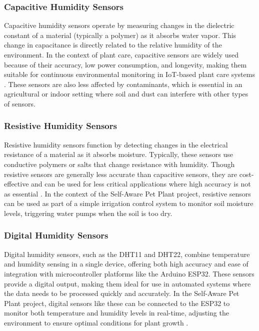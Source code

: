 \documentclass[12pt,a4paper,oneside,english]{book}
\begin{document}
\subsubsection{Capacitive Humidity Sensors}

Capacitive humidity sensors operate by measuring changes in the dielectric constant of a material (typically a polymer) as it absorbs water vapor. This change in capacitance is directly related to the relative humidity of the environment. In the context of plant care, capacitive sensors are widely used because of their accuracy, low power consumption, and longevity, making them suitable for continuous environmental monitoring in IoT-based plant care systems \cite{yuan2020iot}. These sensors are also less affected by contaminants, which is essential in an agricultural or indoor setting where soil and dust can interfere with other types of sensors.

\subsubsection{Resistive Humidity Sensors}

Resistive humidity sensors function by detecting changes in the electrical resistance of a material as it absorbs moisture. Typically, these sensors use conductive polymers or salts that change resistance with humidity. Though resistive sensors are generally less accurate than capacitive sensors, they are cost-effective and can be used for less critical applications where high accuracy is not as essential \cite{theparod2019iot}. In the context of the Self-Aware Pet Plant project, resistive sensors can be used as part of a simple irrigation control system to monitor soil moisture levels, triggering water pumps when the soil is too dry.

\subsubsection{Digital Humidity Sensors}

Digital humidity sensors, such as the DHT11 and DHT22, combine temperature and humidity sensing in a single device, offering both high accuracy and ease of integration with microcontroller platforms like the Arduino ESP32. These sensors provide a digital output, making them ideal for use in automated systems where the data needs to be processed quickly and accurately. In the Self-Aware Pet Plant project, digital sensors like these can be connected to the ESP32 to monitor both temperature and humidity levels in real-time, adjusting the environment to ensure optimal conditions for plant growth \cite{ting2020irrigation}.
\end{document}
